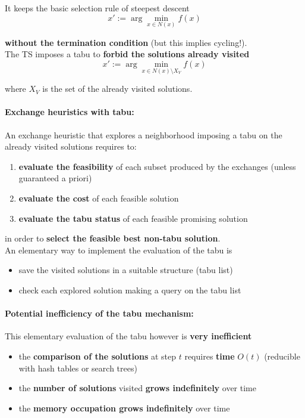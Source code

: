 It keeps the basic selection rule of steepest descent
$$ x' := \arg \min_{x \in N(x)} f (x) $$

\textbf{without the termination condition} (but this implies cycling!).\\

The TS imposes a tabu to \textbf{forbid the solutions already visited}
$$ x' := \arg \min_{x \in N(x) \setminus X_V} f(x) $$

where $X_V$ is the set of the already visited solutions.\\

\paragraph{Exchange heuristics with tabu:} An exchange heuristic that explores a neighborhood imposing a tabu on the already visited solutions requires to:
\begin{enumerate}
	\item \textbf{evaluate the feasibility} of each subset produced by the exchanges (unless guaranteed a priori)
	
	\item \textbf{evaluate the cost} of each feasible solution
	
	\item \textbf{evaluate the tabu status} of each feasible promising solution
	
\end{enumerate}
in order to \textbf{select the feasible best non-tabu solution}.\\

An elementary way to implement the evaluation of the tabu is
\begin{itemize}
	\item save the visited solutions in a suitable structure (tabu list)
	\item check each explored solution making a query on the tabu list
\end{itemize}

\newpage

\paragraph{Potential inefficiency of the tabu mechanism:} This elementary evaluation of the tabu however is \textbf{very inefficient}
\begin{itemize}
	\item the \textbf{comparison of the solutions} at step $t$ requires \textbf{time} $O (t)$ (reducible with hash tables or search trees)
	\item the \textbf{number of solutions} visited \textbf{grows indefinitely} over time
	\item the \textbf{memory occupation grows indefinitely} over time
\end{itemize}

